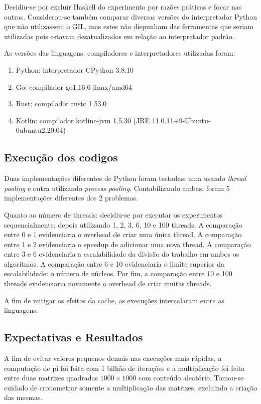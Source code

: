 \documentclass{article}
\begin{document}
Decidiu-se por excluir Haskell do experimento por razões práticas e focar nas outras. Considerou-se também comparar diversas versões do interpretador Python que não utilizassem o GIL, mas estes não dispunham das ferramentas que seriam utilizadas pois estavam desatualizados em relação ao interpretador padrão.

As versões das linguagens, compiladores e interpretadores utilizadas foram:

\begin{enumerate}
    \item Python: interpretador CPython 3.8.10
    \item Go: compilador go1.16.6 linux/amd64
    \item Rust: compilador rustc 1.53.0
    \item Kotlin: compilador kotlinc-jvm 1.5.30 (JRE 11.0.11+9-Ubuntu-0ubuntu2.20.04)
\end{enumerate}

\subsection{Execução dos codigos}
\label{ssec:execucao dos codigos}

Duas implementações diferentes de Python foram testadas: uma usando \emph{thread pooling} e outra utilizando \emph{process pooling}. Contabilizando ambas, foram 5 implementações diferentes dos 2 problemas.

Quanto ao número de threads: decidiu-se por executar os experimentos sequencialmente, depois utilizando 1, 2, 3, 6, 10  e 100 threads. A comparação entre 0 e 1 evidenciaria o overhead de criar uma única thread. A comparação entre 1 e 2 evidenciaria o speedup de adicionar uma nova thread. A comparação entre 3 e 6 evidenciaria a escalabilidade da divisão do trabalho em ambos os algoritmos. A comparação entre 6 e 10 evidenciaria o limite superior da escalabilidade: o número de núcleos. Por fim, a comparação entre 10 e 100 threads evidenciaria novamente o overhead de criar muitas threads.

A fim de mitigar os efeitos da cache, as execuções intercalaram entre as linguagens.

\subsection{Expectativas e Resultados}

A fim de evitar valores pequenos demais nas execuções mais rápidas, a computação de pi foi feita com 1 bilhão de iterações e a multiplicação foi feita entre duas matrizes quadradas $1000 \times 1000$ com conteúdo aleatório. Tomou-se cuidado de cronometrar somente a multiplicação das matrizes, excluindo a criação das mesmas.
\end{document}
